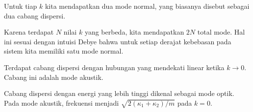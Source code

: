Untuk tiap $k$ kita mendapatkan dua mode normal, yang biasanya disebut
sebagai dua cabang dispersi.

Karena terdapat $N$ nilai $k$ yang berbeda, kita mendapatkan $2N$
total mode. Hal ini sesuai dengan intuisi Debye bahwa untuk setiap
derajat kebebasan pada sistem kita memiliki satu mode normal.

Terdapat cabang dispersi dengan hubungan yang mendekati linear ketika
$k \rightarrow 0$. Cabang ini adalah mode akustik.

Cabang dispersi dengan energi yang lebih tinggi dikenal sebagai mode
optik. Pada mode akustik, frekuensi menjadi
$\sqrt{2(\kappa_{1} + \kappa_{2})/m}$ pada $k = 0$.
